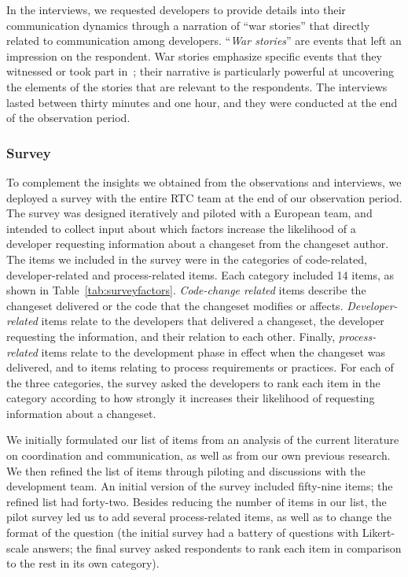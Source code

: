\documentclass[12pt,oneside]{book}
\begin{document}
In the interviews, we requested developers to provide details into their communication dynamics through a narration of ``war stories'' that directly related to communication among developers. ``\emph{War stories}'' are events that left an impression on the respondent. War stories emphasize specific events that they witnessed or took part in~\cite{lutters:ist:2007}; their narrative is particularly powerful at uncovering the elements of the stories that are relevant to the respondents. The interviews lasted between thirty minutes and one hour, and they were conducted at the end of the observation period. 


\subsubsection{Survey}

To complement the insights we obtained from the observations and interviews, we deployed a survey with the entire RTC team at the end of our observation period. The survey was designed iteratively and piloted with a European team, and intended to collect input about which factors increase the likelihood of a developer requesting information about a changeset from the changeset author. The items we included in the survey were in the categories of code-related, developer-related and process-related items. Each category included 14 items, as shown in Table~\ref{tab:surveyfactors}. \emph{Code-change related} items describe the changeset delivered or the code that the changeset modifies or affects. \emph{Developer-related} items relate to
the developers that delivered a changeset, the developer requesting the
information, and their relation to each other. Finally, \emph{process-related} items relate to the development phase in effect when the changeset was delivered, and to items relating to process requirements or practices. For each of the three categories, the survey asked the developers to rank each item in the category according to how strongly it increases their likelihood of requesting information about a changeset. 

We initially formulated our list of items from an analysis of the current literature on coordination and communication, as well as from our own previous research. We then refined the list of items through piloting and discussions with the development team. An initial version of the survey included fifty-nine items; the refined list had forty-two. Besides reducing the number of items in our list, the pilot survey led us to add several process-related items, as well as to change the format of the question (the initial survey had a battery of questions with Likert-scale answers; the final survey asked respondents to rank each item in comparison to the rest in its own category).
\end{document}
